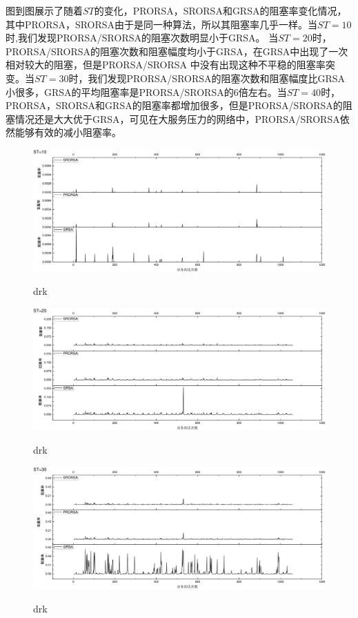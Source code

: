 图到图展示了随着$ST$的变化，PRORSA，SRORSA和GRSA的阻塞率变化情况，其中PRORSA，SRORSA由于是同一种算法，所以其阻塞率几乎一样。当$ST=10$时,我们发现PRORSA/SRORSA的阻塞次数明显小于GRSA。 当$ST=20$时，PRORSA/SRORSA的阻塞次数和阻塞幅度均小于GRSA，在GRSA中出现了一次相对较大的阻塞，但是PRORSA/SRORSA 中没有出现这种不平稳的阻塞率突变。当$ST=30$时，我们发现PRORSA/SRORSA的阻塞次数和阻塞幅度比GRSA小很多，GRSA的平均阻塞率是PRORSA/SRORSA的6倍左右。当$ST=40$时，PRORSA，SRORSA和GRSA的阻塞率都增加很多，但是PRORSA/SRORSA的阻塞情况还是大大优于GRSA，可见在大服务压力的网络中，PRORSA/SRORSA依然能够有效的减小阻塞率。
\begin{figure}
\setlength{\belowcaptionskip}{-0.5cm}
  \begin{center}
    {\includegraphics[width=1 \textwidth]{figures/B10Z.pdf}}
    \end{center}
  \caption{{\footnotesize{drk}}}
  \label{drk}
\end{figure}
\begin{figure}
\setlength{\belowcaptionskip}{-0.5cm}
  \begin{center}
    {\includegraphics[width=1 \textwidth]{figures/B20Z.pdf}}
    \end{center}
  \caption{{\footnotesize{drk}}}
  \label{drk}
\end{figure}
\begin{figure}
\setlength{\belowcaptionskip}{-0.5cm}
  \begin{center}
    {\includegraphics[width=1 \textwidth]{figures/B30Z.pdf}}
    \end{center}
  \caption{{\footnotesize{drk}}}
  \label{drk}
\end{figure}
